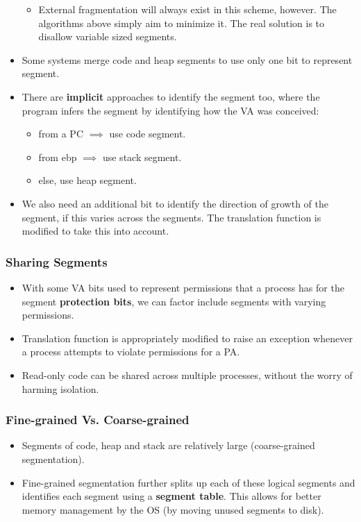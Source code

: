 \documentclass[10pt]{report}
\begin{document}
\begin{itemize}
\begin{itemize}
    \item External fragmentation will always exist in this scheme,
    however. The algorithms above simply aim to minimize it. The real solution is to disallow variable sized segments.
\end{itemize}
\item Some systems merge code and heap segments to use only one bit
to represent segment.
\item There are \textbf{implicit} approaches to identify the segment too, where the program infers the segment by identifying how the 
VA was conceived:
\begin{itemize}
    \item from a PC $\implies$ use code segment.
    \item from ebp $\implies$ use stack segment.
    \item else, use heap segment.
\end{itemize}
\item We also need an additional bit to identify the direction of growth of the segment, if this varies across the segments. The translation function is modified to take this into account.
\end{itemize}
\subsubsection{Sharing Segments}
\begin{itemize}
\item With some VA bits used to represent permissions that a process
has for the segment \textbf{protection bits}, we can factor include segments with varying
permissions.
\item Translation function is appropriately modified to 
raise an exception whenever a process attempts to violate
permissions for a PA.
\item Read-only code can be shared across multiple processes, without
the worry of harming isolation.
\end{itemize}
\subsubsection{Fine-grained Vs. Coarse-grained}
\begin{itemize}
\item Segments of code, heap and stack are relatively large (coarse-grained segmentation).
\item Fine-grained segmentation further splits up each
of these logical segments and identifies each segment using
a \textbf{segment table}. This allows for better memory
management by the OS (by moving unused segments to disk).
\end{itemize}
\end{document}
